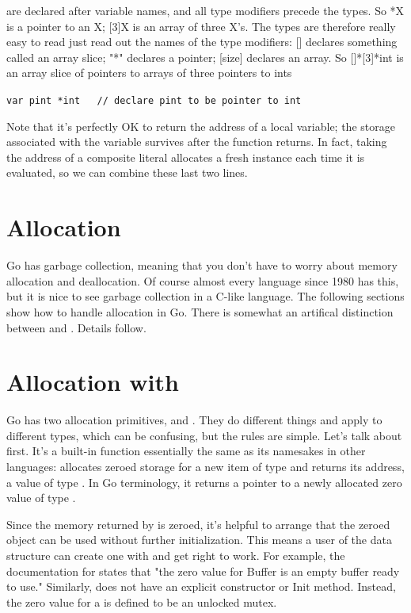 are declared after variable names, and all type modifiers precede the
\todo{}%
types. So *X is a pointer to an X; [3]X is an array of three X's. The
types are therefore really easy to read just read out the names of the
type modifiers: [] declares something called an array slice; "*"
declares a pointer; [size] declares an array. So []*[3]*int is an array
slice of pointers to arrays of three pointers to ints

\noindent\lstinline{var pint *int   // declare pint to be pointer to int}

Note that it's perfectly OK to return the address of a local variable; the
storage associated with the variable survives after the function returns. In
fact, taking the address of a composite literal allocates a fresh instance each
time it is evaluated, so we can combine these last two lines. \cite{effective_go}

\section{Allocation}
Go has garbage collection, meaning that you don't have to worry about
memory allocation and deallocation. Of course almost every language
since 1980 has this, but it is nice to see garbage collection in a
C-like language. The following sections show how to handle allocation
in Go. There is somewhat an artifical distinction between
 and . Details follow.

\section{Allocation with }
Go has two allocation primitives,  and . They do different
things and apply to different types, which can be confusing, but the
rules are simple. Let's talk about  first. It's a built-in function
essentially the same as its namesakes in other languages: 
allocates zeroed storage for a new item of type  and returns its
address, a value of type . In Go terminology, it returns a pointer to
a newly allocated zero value of type .

Since the memory returned by  is zeroed, it's helpful to arrange
that the zeroed object can be used without further initialization. This
means a user of the data structure can create one with  and get
right to work. For example, the documentation for  states
that "the zero value for Buffer is an empty buffer ready to use."
Similarly,  does not have an explicit constructor or Init
method. Instead, the zero value for a  is defined to be an
unlocked mutex.

